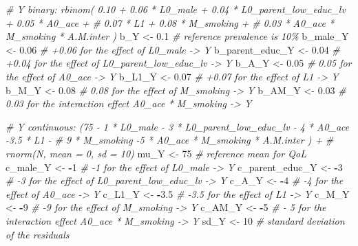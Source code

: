 \documentclass[
]{book}
\newenvironment{Shaded}{\begin{snugshade}}{\end{snugshade}}
\newcommand{\CommentTok}[1]{\textcolor[rgb]{0.56,0.35,0.01}{\textit{#1}}}
\newcommand{\DecValTok}[1]{\textcolor[rgb]{0.00,0.00,0.81}{#1}}
\newcommand{\FloatTok}[1]{\textcolor[rgb]{0.00,0.00,0.81}{#1}}
\newcommand{\NormalTok}[1]{#1}
\newcommand{\OtherTok}[1]{\textcolor[rgb]{0.56,0.35,0.01}{#1}}
\newcommand{\SpecialCharTok}[1]{\textcolor[rgb]{0.81,0.36,0.00}{\textbf{#1}}}
\begin{document}
\begin{Shaded}
\begin{Highlighting}[]
\CommentTok{\# Y binary: rbinom( 0.10 + 0.06 * L0\_male + 0.04 * L0\_parent\_low\_educ\_lv + 0.05 * A0\_ace +}
\CommentTok{\#                   0.07 * L1 + 0.08 * M\_smoking +}
\CommentTok{\#                   0.03 * A0\_ace * M\_smoking * A.M.inter ) }
\NormalTok{b\_Y }\OtherTok{\textless{}{-}} \FloatTok{0.1} \CommentTok{\# reference prevalence is 10\%}
\NormalTok{b\_male\_Y }\OtherTok{\textless{}{-}} \FloatTok{0.06} \CommentTok{\# +0.06 for the effect of L0\_male {-}\textgreater{} Y}
\NormalTok{b\_parent\_educ\_Y }\OtherTok{\textless{}{-}} \FloatTok{0.04} \CommentTok{\# +0.04 for the effect of L0\_parent\_low\_educ\_lv {-}\textgreater{} Y}
\NormalTok{b\_A\_Y }\OtherTok{\textless{}{-}} \FloatTok{0.05} \CommentTok{\# 0.05 for the effect of A0\_ace {-}\textgreater{} Y}
\NormalTok{b\_L1\_Y }\OtherTok{\textless{}{-}} \FloatTok{0.07} \CommentTok{\# +0.07 for the effect of L1 {-}\textgreater{} Y}
\NormalTok{b\_M\_Y }\OtherTok{\textless{}{-}} \FloatTok{0.08} \CommentTok{\# 0.08 for the effect of M\_smoking {-}\textgreater{} Y}
\NormalTok{b\_AM\_Y }\OtherTok{\textless{}{-}} \FloatTok{0.03} \CommentTok{\# 0.03 for the interaction effect A0\_ace * M\_smoking {-}\textgreater{} Y}

\CommentTok{\# Y continuous: (75 {-} 1 * L0\_male {-} 3 * L0\_parent\_low\_educ\_lv {-} 4 * A0\_ace {-}3.5 * L1 {-} }
\CommentTok{\#                9 * M\_smoking {-}5 * A0\_ace * M\_smoking * A.M.inter ) + }
\CommentTok{\#                rnorm(N, mean = 0, sd = 10)}
\NormalTok{mu\_Y }\OtherTok{\textless{}{-}} \DecValTok{75} \CommentTok{\# reference mean for QoL}
\NormalTok{c\_male\_Y }\OtherTok{\textless{}{-}} \SpecialCharTok{{-}}\DecValTok{1} \CommentTok{\# {-}1 for the effect of L0\_male {-}\textgreater{} Y}
\NormalTok{c\_parent\_educ\_Y }\OtherTok{\textless{}{-}} \SpecialCharTok{{-}}\DecValTok{3} \CommentTok{\# {-}3 for the effect of L0\_parent\_low\_educ\_lv {-}\textgreater{} Y}
\NormalTok{c\_A\_Y }\OtherTok{\textless{}{-}} \SpecialCharTok{{-}}\DecValTok{4} \CommentTok{\# {-}4 for the effect of A0\_ace {-}\textgreater{} Y}
\NormalTok{c\_L1\_Y }\OtherTok{\textless{}{-}} \SpecialCharTok{{-}}\FloatTok{3.5} \CommentTok{\# {-}3.5 for the effect of L1 {-}\textgreater{} Y}
\NormalTok{c\_M\_Y }\OtherTok{\textless{}{-}} \SpecialCharTok{{-}}\DecValTok{9} \CommentTok{\# {-}9 for the effect of M\_smoking {-}\textgreater{} Y}
\NormalTok{c\_AM\_Y }\OtherTok{\textless{}{-}} \SpecialCharTok{{-}}\DecValTok{5}  \CommentTok{\# {-} 5 for the interaction effect A0\_ace * M\_smoking  {-}\textgreater{} Y}
\NormalTok{sd\_Y }\OtherTok{\textless{}{-}} \DecValTok{10} \CommentTok{\# standard deviation of the residuals}


\end{Highlighting}
\end{Shaded}
\end{document}
